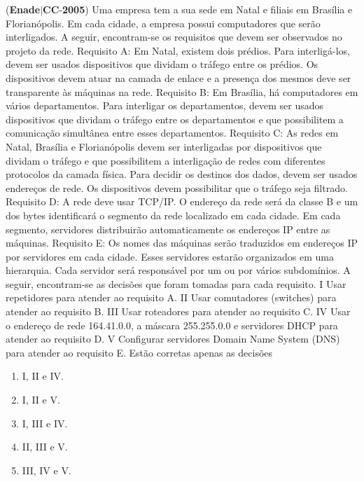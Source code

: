 \documentclass{exam}
\begin{document}
\begin{questions}
\question (\textbf{Enade}$|$\textbf{CC}-\textbf{2005}) Uma empresa tem a sua sede em Natal e filiais em Brasília e
Florianópolis. Em cada cidade, a empresa possui computadores que
serão interligados. A seguir, encontram-se os requisitos que devem
ser observados no projeto da rede.
Requisito A: Em Natal, existem dois prédios. Para interligá-los,
devem ser usados dispositivos que dividam o tráfego entre os prédios.
Os dispositivos devem atuar na camada de enlace e a presença dos
mesmos deve ser transparente às máquinas na rede.
Requisito B: Em Brasília, há computadores em vários departamentos.
Para interligar os departamentos, devem ser usados dispositivos que
dividam o tráfego entre os departamentos e que possibilitem a
comunicação simultânea entre esses departamentos.
Requisito C: As redes em Natal, Brasília e Florianópolis devem ser
interligadas por dispositivos que dividam o tráfego e que possibilitem
a interligação de redes com diferentes protocolos da camada física.
Para decidir os destinos dos dados, devem ser usados endereços de
rede. Os dispositivos devem possibilitar que o tráfego seja filtrado.
Requisito D: A rede deve usar TCP/IP. O endereço da rede será da
classe B e um dos bytes identificará o segmento da rede localizado em
cada cidade. Em cada segmento, servidores distribuirão
automaticamente os endereços IP entre as máquinas.
Requisito E: Os nomes das máquinas serão traduzidos em endereços
IP por servidores em cada cidade. Esses servidores estarão
organizados em uma hierarquia. Cada servidor será responsável por
um ou por vários subdomínios.
A seguir, encontram-se as decisões que foram tomadas para cada
requisito.
I Usar repetidores para atender ao requisito A.
II Usar comutadores (switches) para atender ao requisito B.
III Usar roteadores para atender ao requisito C.
IV Usar o endereço de rede 164.41.0.0, a máscara 255.255.0.0 e
servidores DHCP para atender ao requisito D.
V Configurar servidores Domain Name System (DNS) para
atender ao requisito E.
Estão corretas apenas as decisões
	\begin{enumerate}[label=\alph*)]
		\item  I, II e IV. 
		\item  I, II e V. 
		\item  I, III e IV.
		\item  II, III e V.
		\item  III, IV e V.

	\end{enumerate}


\end{questions}
\end{document}
